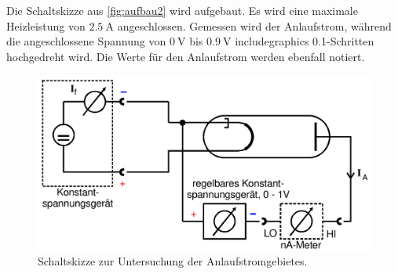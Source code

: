 Die Schaltskizze aus \autoref{fig:aufbau2} wird aufgebaut.
Es wird eine maximale Heizleistung von $\SI{2.5}{\ampere}$ angeschlossen.
Gemessen wird der Anlaufstrom, während die angeschlossene Spannung von $\SI{0}{\volt}$ bis $\SI{0.9}{\volt}$ includegraphics
0.1-Schritten hochgedreht wird. Die Werte für den Anlaufstrom werden ebenfall notiert.

\begin{figure}[H]
    \centering
    \includegraphics[width=0.5\linewidth]{content/grafik/aufbau2.png}
    \caption{Schaltskizze zur Untersuchung der Anlaufstromgebietes.\cite{elektron}}
    \label{fig:aufbau2}
\end{figure}